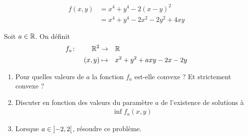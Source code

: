 \documentclass[french,a4paper,10pt]{article}
\begin{document}
	\begin{td-sol}
		\[\begin{aligned}
			f(x,y)&=x^4+y^4-2(x-y)^2\\
			&=x^4+y^4-2x^2-2y^2+4xy
		\end{aligned}\]
	\end{td-sol}
	
	\begin{td-exo}[4]
		Soit $a\in\mathbb{R}$. On définit
		\[\begin{aligned}
			f_a&\colon&\mathbb{R}^2&\to&&\mathbb{R}\\
			&&(x,y)&\mapsto&& x^2+y^2+axy-2x-2y
		\end{aligned}\]
		\begin{enumerate}
			\item Pour quelles valeurs de $a$ la fonction $f_a$ est-elle convexe ? Et strictement convexe ?
			
			\item Discuter en fonction des valeurs du paramètre $a$ de l'existence de solutions à 
				\[\begin{aligned}
					\inf f_a(x,y)
				\end{aligned}\]
				
			\item Lorsque $a\in\mathopen{]}-2,2\mathclose{[}$, résoudre ce problème.
		\end{enumerate}
		
	\end{td-exo}
	\medspace
	
\end{document}
